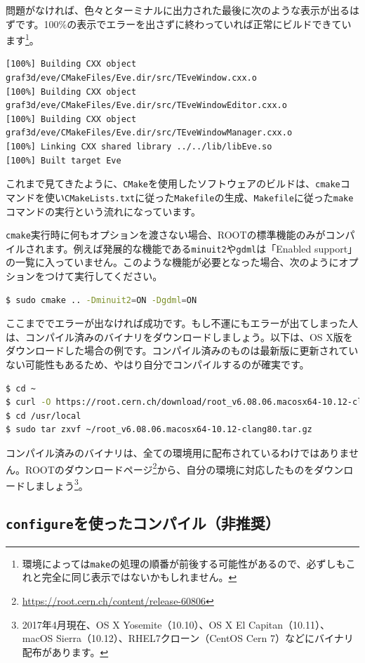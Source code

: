 問題がなければ、色々とターミナルに出力された最後に次のような表示が出るはずです。100\%の表示でエラーを出さずに終わっていれば正常にビルドできています\footnote{環境によっては\texttt{make}の処理の順番が前後する可能性があるので、必ずしもこれと完全に同じ表示ではないかもしれません。}。
\begin{lstlisting}
[100%] Building CXX object graf3d/eve/CMakeFiles/Eve.dir/src/TEveWindow.cxx.o
[100%] Building CXX object graf3d/eve/CMakeFiles/Eve.dir/src/TEveWindowEditor.cxx.o
[100%] Building CXX object graf3d/eve/CMakeFiles/Eve.dir/src/TEveWindowManager.cxx.o
[100%] Linking CXX shared library ../../lib/libEve.so
[100%] Built target Eve
\end{lstlisting}

これまで見てきたように、\texttt{CMake}を使用したソフトウェアのビルドは、\texttt{cmake}コマンドを使い\texttt{CMakeLists.txt}に従った\texttt{Makefile}の生成、\texttt{Makefile}に従った\texttt{make}コマンドの実行という流れになっています。

\texttt{cmake}実行時に何もオプションを渡さない場合、ROOTの標準機能のみがコンパイルされます。例えば発展的な機能である\texttt{minuit2}や\texttt{gdml}は「Enabled support」の一覧に入っていません。このような機能が必要となった場合、次のようにオプションをつけて実行してください。

\begin{lstlisting}[language=bash]
$ sudo cmake .. -Dminuit2=ON -Dgdml=ON
\end{lstlisting}

ここまででエラーが出なければ成功です。もし不運にもエラーが出てしまった人は、コンパイル済みのバイナリをダウンロードしましょう。以下は、OS X版をダウンロードした場合の例です。コンパイル済みのものは最新版に更新されていない可能性もあるため、やはり自分でコンパイルするのが確実です。
\begin{lstlisting}[language=bash]
$ cd ~
$ curl -O https://root.cern.ch/download/root_v6.08.06.macosx64-10.12-clang80.tar.gz
$ cd /usr/local
$ sudo tar zxvf ~/root_v6.08.06.macosx64-10.12-clang80.tar.gz
\end{lstlisting}
コンパイル済みのバイナリは、全ての環境用に配布されているわけではありません。ROOTのダウンロードページ\footnote{\url{https://root.cern.ch/content/release-60806}}から、自分の環境に対応したものをダウンロードしましょう\footnote{2017年4月現在、OS X Yosemite（10.10）、OS X El Capitan（10.11）、macOS Sierra（10.12）、RHEL7クローン（CentOS Cern 7）などにバイナリ配布があります。}。

\subsection{\texttt{configure}を使ったコンパイル（非推奨）}
\label{subsec_compile_configure}

